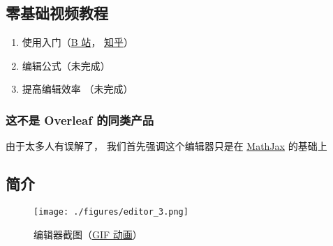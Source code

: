 
\subsection{零基础视频教程}
\begin{enumerate}
\item 使用入门（\href{https://www.bilibili.com/video/av87698355/}{B 站}， \href{https://zhuanlan.zhihu.com/p/105869878}{知乎}）
\item 编辑公式（未完成）
\item 提高编辑效率 （未完成）
\end{enumerate}

\subsubsection{这不是 Overleaf 的同类产品}
由于太多人有误解了， 我们首先强调这个编辑器只是在 \href{https://www.mathjax.org/}{MathJax} 的基础上

\subsection{简介}
\begin{figure}[ht]
\centering
\texttt{[image: ./figures/editor\_3.png]}
\caption{编辑器截图（\href{http://wuli.wiki/apps/editor.gif}{GIF 动画}）} \label{editor_fig3}
\end{figure}

